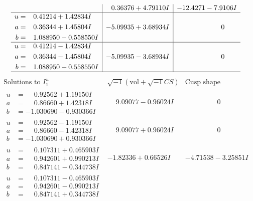 \documentclass[1p]{elsarticle_modified}
\theoremstyle{definition}
\newcommand{\I}{\sqrt{-1}}
\begin{document}
$$\begin{array}{c|c|c}
 & \phantom{-}0.36376 + 4.79110 I & -12.4271 - 7.9106 I \\ \hline\begin{aligned}
u &= \phantom{-}0.41214 + 1.42834 I \\
a &= \phantom{-}0.36344 + 1.45804 I \\
b &= \phantom{-}1.088950 - 0.558550 I\end{aligned}
 & -5.09935 + 3.68934 I & \phantom{-0.000000 } 0 \\ \hline\begin{aligned}
u &= \phantom{-}0.41214 - 1.42834 I \\
a &= \phantom{-}0.36344 - 1.45804 I \\
b &= \phantom{-}1.088950 + 0.558550 I\end{aligned}
 & -5.09935 - 3.68934 I & \phantom{-0.000000 } 0\\
 \hline 
 \end{array}$$\newpage$$\begin{array}{c|c|c}  
\text{Solutions to }I^u_{1}& \I (\text{vol} + \sqrt{-1}CS) & \text{Cusp shape}\\
 \hline 
\begin{aligned}
u &= \phantom{-}0.92562 + 1.19150 I \\
a &= \phantom{-}0.86660 + 1.42318 I \\
b &= -1.030690 - 0.930366 I\end{aligned}
 & \phantom{-}9.09077 - 0.96024 I & \phantom{-0.000000 } 0 \\ \hline\begin{aligned}
u &= \phantom{-}0.92562 - 1.19150 I \\
a &= \phantom{-}0.86660 - 1.42318 I \\
b &= -1.030690 + 0.930366 I\end{aligned}
 & \phantom{-}9.09077 + 0.96024 I & \phantom{-0.000000 } 0 \\ \hline\begin{aligned}
u &= \phantom{-}0.107311 + 0.465903 I \\
a &= \phantom{-}0.942601 + 0.990213 I \\
b &= \phantom{-}0.847141 - 0.344738 I\end{aligned}
 & -1.82336 + 0.66526 I & -4.71538 - 3.25851 I \\ \hline\begin{aligned}
u &= \phantom{-}0.107311 - 0.465903 I \\
a &= \phantom{-}0.942601 - 0.990213 I \\
b &= \phantom{-}0.847141 + 0.344738 I\end{aligned}

\end{array}$$
\end{document}
